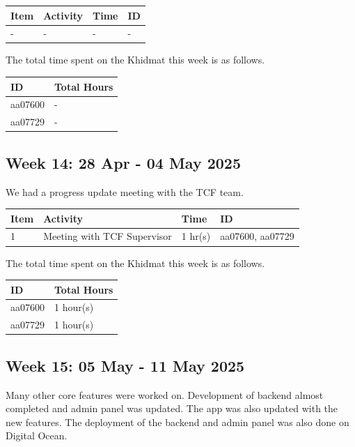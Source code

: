 \documentclass[12pt,a4paper]{article}
\begin{document}
\begin{center}
    \bigskip
    \begin{tabular}{|l|l|l|l|}
        \hline
        Item 	& Activity & Time & ID \\\hline\hline
        - & - & - & - \\\hline
    \end{tabular}

    \bigskip
    The total time spent on the Khidmat this week is as follows.

    \bigskip
    \begin{tabular}{|l|l|}
        \hline
        ID & Total Hours\\\hline\hline
        aa07600 & -\\\hline
        aa07729 & -\\\hline
    \end{tabular}
\end{center}

\newpage

\subsection{Week 14: 28 Apr - 04 May 2025}
We had a progress update meeting with the TCF team.

\begin{center}
    \bigskip
    \begin{tabular}{|l|l|l|l|}
        \hline
        Item 	& Activity & Time & ID \\\hline\hline
        1	& Meeting with TCF Supervisor  & 1 hr(s) & aa07600, aa07729 \\\hline
    \end{tabular}

    \bigskip
    The total time spent on the Khidmat this week is as follows.

    \bigskip
    \begin{tabular}{|l|l|}
        \hline
        ID & Total Hours\\\hline\hline
        aa07600 & 1 hour(s)\\\hline
        aa07729 & 1 hour(s)\\\hline
    \end{tabular}
\end{center}

\newpage

\subsection{Week 15: 05 May - 11 May 2025}
Many other core features were worked on. Development of backend almost completed and admin panel was updated. The app was also updated with the new features. The deployment of the backend and admin panel was also done on Digital Ocean.
\end{document}

